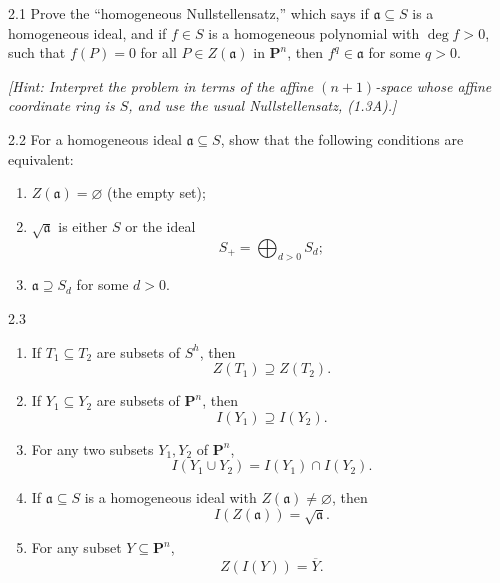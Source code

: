 \documentclass[12pt]{article}
\begin{document}


\begin{problem}{2.1}
Prove the ``homogeneous Nullstellensatz,'' which says if $\mathfrak a \subseteq S$ is a homogeneous ideal, and if $f\in S$ is a homogeneous polynomial with $\deg f>0$, such that $f(P)=0$ for all $P\in Z(\mathfrak a)$ in $\mathbf P^n$, then $f^q\in \mathfrak a$ for some $q>0$.

\emph{[Hint: Interpret the problem in terms of the affine $(n+1)$-space whose affine coordinate ring is $S$, and use the usual Nullstellensatz, (1.3A).]}
\end{problem}

\begin{problem}{2.2}
For a homogeneous ideal $\mathfrak a \subseteq S$, show that the following conditions are equivalent:
\begin{enumerate}
    \item[(i)] $Z(\mathfrak a)=\varnothing$ (the empty set);
    \item[(ii)] $\sqrt{\mathfrak a}$ is either $S$ or the ideal
    \[
    S_+ = \bigoplus_{d>0} S_d;
    \]
    \item[(iii)] $\mathfrak a \supseteq S_d$ for some $d>0$.
\end{enumerate}
\end{problem}

\begin{problem}{2.3}
\begin{enumerate}
    \item[(a)] If $T_1\subseteq T_2$ are subsets of $S^h$, then
    \[
    Z(T_1)\supseteq Z(T_2).
    \]

    \item[(b)] If $Y_1\subseteq Y_2$ are subsets of $\mathbf P^n$, then
    \[
    I(Y_1)\supseteq I(Y_2).
    \]

    \item[(c)] For any two subsets $Y_1,Y_2$ of $\mathbf P^n$,
    \[
    I(Y_1\cup Y_2)=I(Y_1)\cap I(Y_2).
    \]

    \item[(d)] If $\mathfrak a\subseteq S$ is a homogeneous ideal with $Z(\mathfrak a)\neq\varnothing$, then
    \[
    I(Z(\mathfrak a))=\sqrt{\mathfrak a}.
    \]

    \item[(e)] For any subset $Y\subseteq \mathbf P^n$,
    \[
    Z(I(Y))=\overline{Y}.
    \]
\end{enumerate}
\end{problem}
\end{document}

